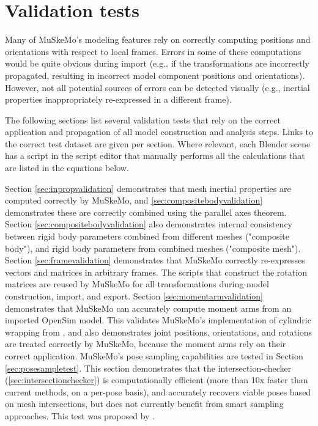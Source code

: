 \documentclass{article}
\begin{document}
\section{Validation tests}

Many of MuSkeMo's modeling features rely on correctly computing positions and orientations with respect to local frames. Errors in some of these computations would be quite obvious during import (e.g., if the transformations are incorrectly propagated, resulting in incorrect model component positions and orientations). However, not all potential sources of errors can be detected visually (e.g., inertial properties inappropriately re-expressed in a different frame). 

The following sections list several validation tests that rely on the correct application and propagation of all model construction and analysis steps. Links to the correct test dataset are given per section. Where relevant, each Blender scene has a script in the script editor that manually performs all the calculations that are listed in the equations below.

Section \ref{sec:inpropvalidation} demonstrates that mesh inertial properties are computed correctly by MuSkeMo, and \ref{sec:compositebodyvalidation} demonstrates these are correctly combined using the parallel axes theorem. Section \ref{sec:compositebodyvalidation} also demonstrates internal consistency between rigid body parameters combined from different meshes ("composite body"), and rigid body parameters from combined meshes ("composite mesh"). Section \ref{sec:framevalidation} demonstrates that MuSkeMo correctly re-expresses vectors and matrices in arbitrary frames. The scripts that construct the rotation matrices are reused by MuSkeMo for all transformations during model construction, import, and export. Section \ref{sec:momentarmvalidation} demonstrates that MuSkeMo can accurately compute moment arms from an imported OpenSim model. This validates MuSkeMo's implementation of cylindric wrapping from \cite{garnerObstacleSetMethodRepresenting2000}, and also demonstrates joint positions, orientations, and rotations are treated correctly by MuSkeMo, because the moment arms rely on their correct application. MuSkeMo's pose sampling capabilities are tested in Section \ref{sec:posesampletest}. This section demonstrates that the intersection-checker (\ref{sec:intersectionchecker}) is computationally efficient (more than 10x faster than current methods, on a per-pose basis), and accurately recovers viable poses based on mesh intersections, but does not currently benefit from smart sampling approaches. This test was proposed by \cite{bishopIntelligentSamplingHighdimensional2023}. 
\end{document}
